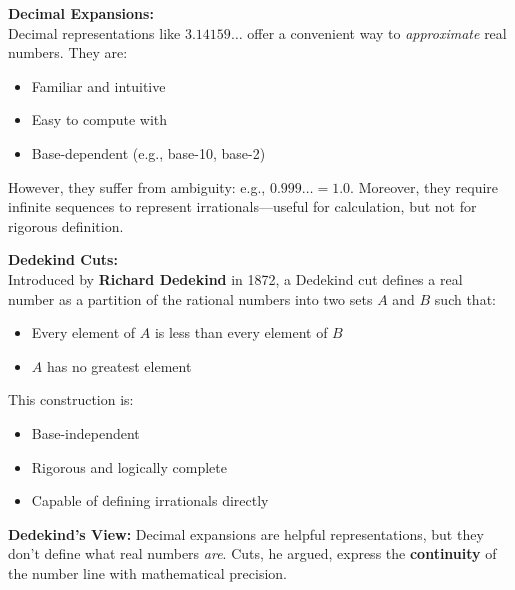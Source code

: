     
    
    
    
    
    
    
    
    



\begin{tcolorbox}[colback=gray!5!white, colframe=black!75!white, title={Sidebar: Dedekind Cuts vs. Decimal Expansions}]
    \textbf{Decimal Expansions:}\\
    Decimal representations like \( 3.14159\ldots \) offer a convenient way to \emph{approximate} real numbers. They are:
    \begin{itemize}
      \item Familiar and intuitive
      \item Easy to compute with
      \item Base-dependent (e.g., base-10, base-2)
    \end{itemize}
    However, they suffer from ambiguity: e.g., \( 0.999\ldots = 1.0 \). Moreover, they require infinite sequences to represent irrationals—useful for calculation, but not for rigorous definition.
    
    \medskip
    
    \textbf{Dedekind Cuts:}\\
    Introduced by \textbf{Richard Dedekind} in 1872, a Dedekind cut defines a real number as a partition of the rational numbers into two sets \( A \) and \( B \) such that:
    \begin{itemize}
      \item Every element of \( A \) is less than every element of \( B \)
      \item \( A \) has no greatest element
    \end{itemize}
    This construction is:
    \begin{itemize}
      \item Base-independent
      \item Rigorous and logically complete
      \item Capable of defining irrationals directly
    \end{itemize}
    
    \textbf{Dedekind’s View:} Decimal expansions are helpful representations, but they don't define what real numbers \emph{are}. Cuts, he argued, express the \textbf{continuity} of the number line with mathematical precision.
    
\end{tcolorbox}
